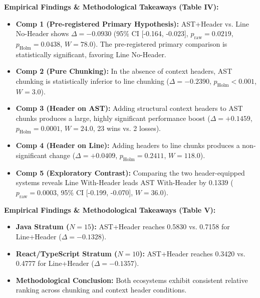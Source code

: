 \documentclass[11pt,a4paper,landscape]{article}
\begin{document}

\FloatBarrier
\vspace{-0.1cm}
{\small
\noindent\textbf{Empirical Findings \& Methodological Takeaways (Table IV):}
\begin{itemize}[nosep,topsep=2pt,partopsep=0pt,itemsep=2pt]
    \item \textbf{Comp 1 (Pre-registered Primary Hypothesis):} AST+Header vs. Line No-Header shows $\Delta = -0.0930$ (95\% CI [-0.164, -0.023], $p_{\mathrm{raw}} = 0.0219$, $p_{\mathrm{Holm}} = 0.0438$, $W = 78.0$). The pre-registered primary comparison is statistically significant, favoring Line No-Header.
    \item \textbf{Comp 2 (Pure Chunking):} In the absence of context headers, AST chunking is statistically inferior to line chunking ($\Delta = -0.2390$, $p_{\mathrm{Holm}} < 0.001$, $W = 3.0$).
    \item \textbf{Comp 3 (Header on AST):} Adding structural context headers to AST chunks produces a large, highly significant performance boost ($\Delta = +0.1459$, $p_{\mathrm{Holm}} = 0.0001$, $W = 24.0$, 23 wins vs. 2 losses).
    \item \textbf{Comp 4 (Header on Line):} Adding headers to line chunks produces a non-significant change ($\Delta = +0.0409$, $p_{\mathrm{Holm}} = 0.2411$, $W = 118.0$).
    \item \textbf{Comp 5 (Exploratory Contrast):} Comparing the two header-equipped systems reveals Line With-Header leads AST With-Header by 0.1339 ($p_{\mathrm{raw}} = 0.0003$, 95\% CI [-0.199, -0.070], $W = 36.0$).
\end{itemize}
}
\clearpage


\FloatBarrier
\vspace{-0.1cm}
{\small
\noindent\textbf{Empirical Findings \& Methodological Takeaways (Table V):}
\begin{itemize}[nosep,topsep=2pt,partopsep=0pt,itemsep=2pt]
    \item \textbf{Java Stratum ($N=15$):} AST+Header reaches 0.5830 vs. 0.7158 for Line+Header ($\Delta = -0.1328$).
    \item \textbf{React/TypeScript Stratum ($N=10$):} AST+Header reaches 0.3420 vs. 0.4777 for Line+Header ($\Delta = -0.1357$).
    \item \textbf{Methodological Conclusion:} Both ecosystems exhibit consistent relative ranking across chunking and context header conditions.
\end{itemize}
}
\clearpage
\end{document}
